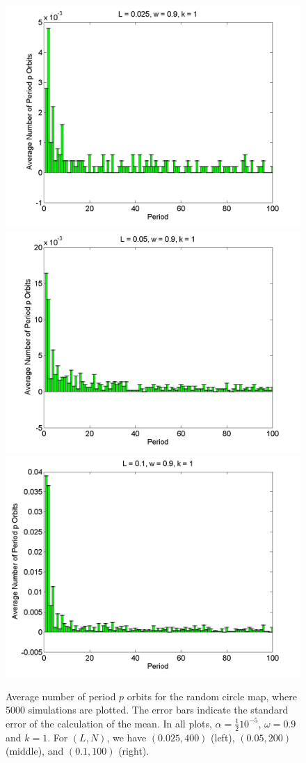 \begin{figure}[H]\linespread{1}
\caption[Average number of period $p$ orbits for the random circle
map (uniform distribution), for $\alpha = \frac{1}{2}10^{-5}$, $\omega=0.9$ and $k=1$]{Average number of period $p$ orbits for the random circle
map, where 5000 simulations are plotted. The error bars indicate
the standard error of the calculation of the mean. In all plots,
$\alpha = \frac{1}{2}10^{-5}$, $\omega=0.9$ and $k=1$. For $(L,N)$,
we have $(0.025, 400)$ (left), $(0.05, 200)$
(middle), and $(0.1, 100)$ (right).}\label{fig:rcirchist_u_ha1}
	\begin{center}
\includegraphics[width=.33\textwidth]{figs/rcirc_hist_u_halfa_L_0025_w_09_k_1_sims_5000.png}\hfill
\includegraphics[width=.33\textwidth]{figs/rcirc_hist_u_halfa_L_005_w_09_k_1_sims_5000.png}\hfill
\includegraphics[width=.33\textwidth]{figs/rcirc_hist_u_halfa_L_01_w_09_k_1_sims_5000.png}
	\end{center}
\end{figure}

